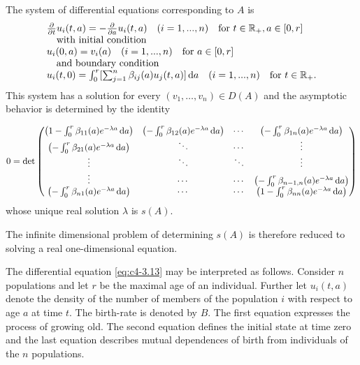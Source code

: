 \begin{example}
The system of differential equations corresponding to $A$ is
\begin{equation} \label{eq:c4-3.13}
\begin{array}{l}
\frac{\partial}{\partial t}u_i(t,a) = - \frac{\partial}{\partial a}u_i(t,a) \quad (i=1,...,n) \quad \text{for } t\in\mathbb{R}_+, a\in[0,r]\\
\quad \text{with initial condition} \\
u_i(0,a) = v_i(a) \quad (i=1,...,n) \quad \text{for } a\in[0,r] \\
\quad \text{and boundary condition} \\
u_i(t,0) = \int_0^r [\sum_{j=1}^n \beta_{ij}(a)u_j(t,a)]\mathop{}\!\mathrm{d}{a} \quad (i=1,...,n) \quad \text{for } t\in\mathbb{R}_+.
\end{array}
\end{equation}
This system has a solution for every $(v_{1}, \ldots, v_{n}) \in D(A)$ and the asymptotic behavior is determined by the identity

\[
0 = \det \begin{pmatrix}
\left(1 - \int_{0}^{r} \beta_{11}(a)e^{-\lambda a} \mathop{}\!\mathrm{d}{a}\right) 
  & \left(-\int_{0}^{r} \beta_{12}(a)e^{-\lambda a} \mathop{}\!\mathrm{d}{a}\right) 
  & \cdots 
  & \left(-\int_{0}^{r} \beta_{1n}(a)e^{-\lambda a} \mathop{}\!\mathrm{d}{a}\right) \\
\left(-\int_{0}^{r} \beta_{21}(a)e^{-\lambda a} \mathop{}\!\mathrm{d}{a}\right) 
  & \ddots 
  & \cdots
  & \vdots \\
\vdots 
  & \ddots 
  & \ddots  
  & \vdots \\
\vdots
  & \cdots 
  & \cdots
  & \left(-\int_{0}^{r} \beta_{n-1,n}(a)e^{-\lambda a} \mathop{}\!\mathrm{d}{a}\right) \\
\left(-\int_{0}^{r} \beta_{n1}(a)e^{-\lambda a} \mathop{}\!\mathrm{d}{a}\right) 
  & \cdots 
  & \cdots
  & \left(1 - \int_{0}^{r} \beta_{nn}(a)e^{-\lambda a} \mathop{}\!\mathrm{d}{a}\right)
\end{pmatrix}
\]
whose unique real solution $\lambda$ is $s(A)$.

The infinite dimensional problem of determining $s(A)$ is therefore reduced to solving a real one-dimensional equation.
\end{example}

The differential equation \eqref{eq:c4-3.13} may be interpreted as follows.
Consider $n$ populations and let $r$ be the maximal age of an individual.
Further let $u_{i}(t,a)$ denote the density of the number of members of the population $i$ with respect to age $a$ at time $t$.
The birth-rate is denoted by $B$.
The first equation expresses the process of growing old.
The second equation defines the initial state at time zero and the last equation describes mutual dependences of birth from individuals of the $n$ populations.

